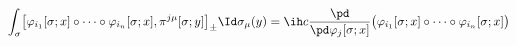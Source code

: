 \begin{equation}	\label{12.49}
\int_\sigma \bigl[
	\varphi_{i_1}[\sigma;x]\circ\dots\circ\varphi_{i_n}[\sigma;x]
	,
	\pi^{j\mu}[\sigma;y]
\bigr]_{\pm} \Id\sigma_\mu(y)
=
\ih c  \frac{\pd}{\pd\varphi_j[\sigma;x]}
\bigl(
	\varphi_{i_1}[\sigma;x]\circ\dots\circ\varphi_{i_n}[\sigma;x]
\bigr)
	\end{equation}

